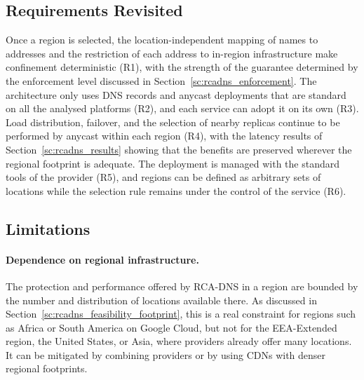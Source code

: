 \subsection{Requirements Revisited}
\label{sc:rcadns_discussion_requirements}

Once a region is selected, the location-independent mapping of names to addresses and the restriction of each address to in-region infrastructure make confinement deterministic (R1), with the strength of the guarantee determined by the enforcement level discussed in Section~\ref{sc:rcadns_enforcement}. The architecture only uses DNS records and anycast deployments that are standard on all the analysed platforms (R2), and each service can adopt it on its own (R3). Load distribution, failover, and the selection of nearby replicas continue to be performed by anycast within each region (R4), with the latency results of Section~\ref{sc:rcadns_results} showing that the benefits are preserved wherever the regional footprint is adequate. The deployment is managed with the standard tools of the provider (R5), and regions can be defined as arbitrary sets of locations while the selection rule remains under the control of the service (R6).

\subsection{Limitations}
\label{sc:rcadns_discussion_limitations}

\paragraph{Dependence on regional infrastructure.} The protection and performance offered by RCA-DNS in a region are bounded by the number and distribution of locations available there. As discussed in Section~\ref{sc:rcadns_feasibility_footprint}, this is a real constraint for regions such as Africa or South America on Google Cloud, but not for the EEA-Extended region, the United States, or Asia, where providers already offer many locations. It can be mitigated by combining providers or by using CDNs with denser regional footprints.

